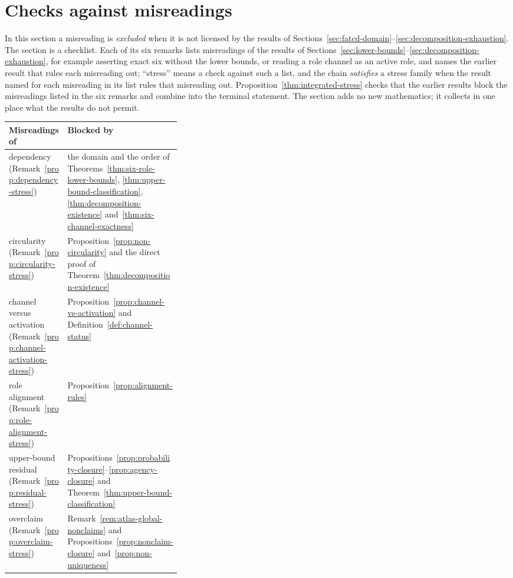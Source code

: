 \section{Checks against misreadings}\label{sec:integrated-stress}



In this section a misreading is \emph{excluded} when it is not licensed by the
results of
Sections~\ref{sec:fatcd-domain}--\ref{sec:decomposition-exhaustion}.
The section is a checklist. Each of its six remarks lists misreadings of
the results of Sections~\ref{sec:lower-bounds}--\ref{sec:decomposition-exhaustion},
for example asserting exact six without the lower bounds, or reading a
role channel as an active role, and names the earlier result that rules
each misreading out; ``stress'' means a check against such a list, and the
chain \emph{satisfies} a stress family when the result named for each
misreading in its list rules that misreading out.
Proposition~\ref{thm:integrated-stress} checks that the earlier results
block the misreadings listed in the six remarks and combine into the terminal statement.
The section adds no new mathematics; it collects in one place what the
results do not permit.

\begin{center}
\small
\begin{tabularx}{\linewidth}{@{}>{\raggedright\arraybackslash}p{0.34\linewidth}>{\raggedright\arraybackslash}X@{}}
\toprule
Misreadings of & Blocked by \\
\midrule
dependency (Remark~\ref{prop:dependency-stress}) & the \FATCD{} domain and the order of Theorems~\ref{thm:six-role-lower-bounds}, \ref{thm:upper-bound-classification}, \ref{thm:decomposition-existence} and~\ref{thm:six-channel-exactness} \\
circularity (Remark~\ref{prop:circularity-stress}) & Proposition~\ref{prop:non-circularity} and the direct proof of Theorem~\ref{thm:decomposition-existence} \\
channel versus activation (Remark~\ref{prop:channel-activation-stress}) & Proposition~\ref{prop:channel-vs-activation} and Definition~\ref{def:channel-status} \\
role alignment (Remark~\ref{prop:role-alignment-stress}) & Proposition~\ref{prop:alignment-rules} \\
upper-bound residual (Remark~\ref{prop:residual-stress}) & Propositions~\ref{prop:probability-closure}--\ref{prop:agency-closure} and Theorem~\ref{thm:upper-bound-classification} \\
overclaim (Remark~\ref{prop:overclaim-stress}) & Remark~\ref{rem:atlas-global-nonclaims} and Propositions~\ref{prop:nonclaim-closure} and~\ref{prop:non-uniqueness} \\
\bottomrule
\end{tabularx}
\end{center}

